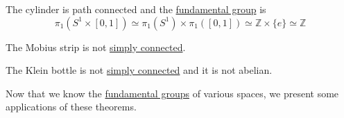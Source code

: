   \begin{example}[Cylinder]
    \label{ex:cylinder}
    The cylinder is path connected and the \hyperref[def:fundamental-group]{fundamental group} is 
    \begin{equation}
      \pi_1 (S^1 \times [0, 1]) \simeq \pi_1 (S^1) \times \pi_1 ([0, 1]) \simeq \mathbb{Z} \times \{e\} \simeq \mathbb{Z} 
    \end{equation}
  \end{example}

  \begin{example}
    \label{ex:mobius-strip-2}
    The Mobius strip is not \hyperref[def:simply-connected]{simply connected}. 
  \end{example}

  \begin{example}
    \label{ex:klein-bottle}
    The Klein bottle is not \hyperref[def:simply-connected]{simply connected} and it is not abelian. 
  \end{example}

	Now that we know the \hyperref[def:fundamental-group]{fundamental groups} of various spaces, we present some applications of these theorems. 

